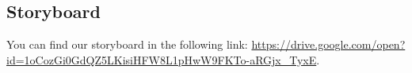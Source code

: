 \subsection{Storyboard}

You can find our storyboard in the following link: 
\url{https://drive.google.com/open?id=1oCozGi0GdQZ5LKisiHFW8L1pHwW9FKTo-aRGjx_TyxE}.


